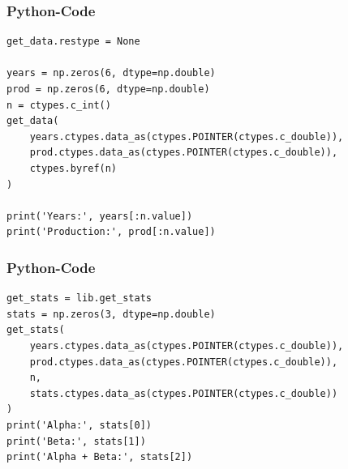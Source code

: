 \documentclass{beamer}
\begin{document}
\begin{frame}[fragile]
\frametitle{Python-Code}
\begin{lstlisting}
get_data.restype = None

years = np.zeros(6, dtype=np.double)
prod = np.zeros(6, dtype=np.double)
n = ctypes.c_int()
get_data(
    years.ctypes.data_as(ctypes.POINTER(ctypes.c_double)),
    prod.ctypes.data_as(ctypes.POINTER(ctypes.c_double)),
    ctypes.byref(n)
)

print('Years:', years[:n.value])
print('Production:', prod[:n.value])

\end{lstlisting}
\end{frame}

\begin{frame}[fragile]
\frametitle{Python-Code}
\begin{lstlisting}
get_stats = lib.get_stats
stats = np.zeros(3, dtype=np.double)
get_stats(
    years.ctypes.data_as(ctypes.POINTER(ctypes.c_double)),
    prod.ctypes.data_as(ctypes.POINTER(ctypes.c_double)),
    n,
    stats.ctypes.data_as(ctypes.POINTER(ctypes.c_double))
)
print('Alpha:', stats[0])
print('Beta:', stats[1])
print('Alpha + Beta:', stats[2])
\end{lstlisting}
\end{frame}
\end{document}
